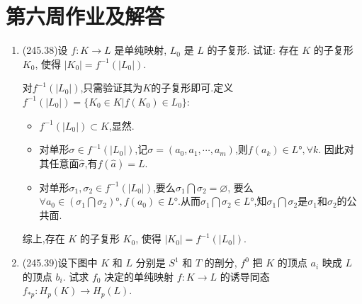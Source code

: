 \section{第六周作业及解答}
\begin{enumerate}

    
    \item (245.38)设 $f: K \to L$ 是单纯映射, $L_0$ 是 $L$ 的子复形. 试证: 存在 $K$ 的子复形 $K_0$, 使得 $|K_0| = f^{-1}(|L_0|)$.
    \begin{proofc}[解答]
        对$f^{-1}(|L_0|)$,只需验证其为$K$的子复形即可.定义$f^{-1}(|L_0|)=\{K_0\in K|f(K_0)\in L_0\}$:\\
        \begin{itemize}
            \item[(a)] $f^{-1}(|L_0|)\subset K$,显然.
            \item[(b)] 对单形$\sigma\in f^{-1}(|L_0|)$,记$\sigma=(a_0,a_1,\cdots,a_m)$,则$f(a_k)\in L°,\forall k$.
            因此对其任意面$\hat{\sigma}$,有$f(\hat{a})=L$.
            \item[(c)] 对单形$\sigma_1,\sigma_2\in f^{-1}(|L_0|)$,要么$\sigma_1\bigcap\sigma_2=\varnothing$,
            要么$\forall a_0\in (\sigma_1\bigcap\sigma_2)°,f(a_0)\in L°$.从而$\sigma_1\bigcap\sigma_2\in L°$,知$\sigma_1\bigcap\sigma_2$是$\sigma_1$和$\sigma_2$的公共面.
        \end{itemize}
        综上,存在 $K$ 的子复形 $K_0$, 使得 $|K_0| = f^{-1}(|L_0|)$.
    \end{proofc}
    \item (245.39)设下图中 $K$ 和 $L$ 分别是 $S^1$ 和 $T$ 的剖分, $f^0$ 把 $K$ 的顶点 $a_i$ 映成 $L$ 的顶点 $b_i$. 试求 $f_0$ 决定的单纯映射 $f: K \to L$ 的诱导同态 $f_{*p}: H_p(K) \to H_p(L)$.
\end{enumerate}
